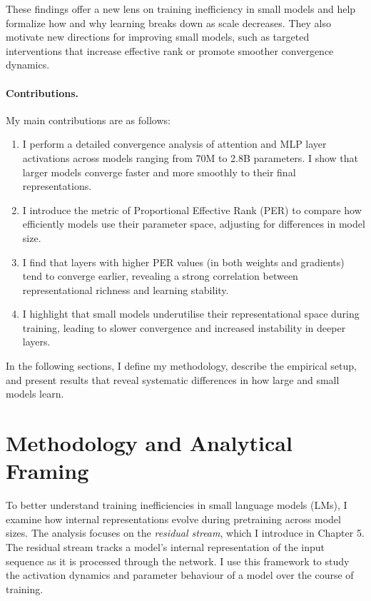 These findings offer a new lens on training inefficiency in small models and help formalize how and why learning breaks down as scale decreases. They also motivate new directions for improving small models, such as targeted interventions that increase effective rank or promote smoother convergence dynamics.

\paragraph{Contributions.}
My main contributions are as follows:
\begin{enumerate}
    \item I perform a detailed convergence analysis of attention and MLP layer activations across models ranging from 70M to 2.8B parameters. I show that larger models converge faster and more smoothly to their final representations.

    \item I introduce the metric of Proportional Effective Rank (PER) to compare how efficiently models use their parameter space, adjusting for differences in model size.

    \item I find that layers with higher PER values (in both weights and gradients) tend to converge earlier, revealing a strong correlation between representational richness and learning stability.

    \item I highlight that small models underutilise their representational space during training, leading to slower convergence and increased instability in deeper layers.
\end{enumerate}

In the following sections, I define my methodology, describe the empirical setup, and present results that reveal systematic differences in how large and small models learn.

\section{Methodology and Analytical Framing}
\label{sec:methodology}

To better understand training inefficiencies in small language models (LMs), I examine how internal representations evolve during pretraining across model sizes. The analysis focuses on the \textit{residual stream}, which I introduce in Chapter 5. The residual stream tracks a model's internal representation of the input sequence as it is processed through the network. I use this framework to study the activation dynamics and parameter behaviour of a model over the course of training.

